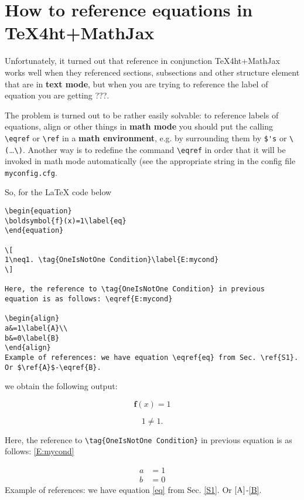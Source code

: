 \documentclass{article}
\begin{document}
\section{How to reference equations in TeX4ht+MathJax}\label{S2}
Unfortunately, it turned out that reference in conjunction TeX4ht+MathJax
works well when they referenced sections, subsections and other structure
element that are in \textbf{text mode}, but when you are trying to reference
the label of equation you are getting ???.

The problem is turned out to be rather easily solvable: to reference labels
of equations, align or other things in \textbf{math mode} you should put the
calling \verb|\eqref| or \verb|\ref| in a \textbf{math environment}, e.g. by
surrounding them by \verb|$'s| or \verb|\(|\ldots\verb|\)|. Another way is to
redefine the command \verb|\eqref| in order that it will be invoked in math
mode automatically (see the appropriate string in the config file
\verb|myconfig.cfg|.

So, for the \LaTeX{} code below
{\small
\begin{verbatim}
\begin{equation}
\boldsymbol{f}(x)=1\label{eq}
\end{equation}

\[
1\neq1. \tag{OneIsNotOne Condition}\label{E:mycond}
\]

Here, the reference to \tag{OneIsNotOne Condition} in previous
equation is as follows: \eqref{E:mycond}

\begin{align}
a&=1\label{A}\\
b&=0\label{B}
\end{align}
Example of references: we have equation \eqref{eq} from Sec. \ref{S1}. Or $\ref{A}$-\eqref{B}.
\end{verbatim}}
\noindent we obtain the following output:

\begin{equation}
\boldsymbol{f}(x)=1\label{eq}
\end{equation}

\[
1\neq1. \tag{OneIsNotOne Condition}\label{E:mycond}
\]

Here, the reference to \verb|\tag{OneIsNotOne Condition}| in previous
equation is as follows: \eqref{E:mycond}

\begin{align}
a&=1\label{A}\\
b&=0\label{B}
\end{align}
Example of references: we have equation \eqref{eq} from Sec. \ref{S1}. Or
$\ref{A}$-\eqref{B}.
\end{document}
